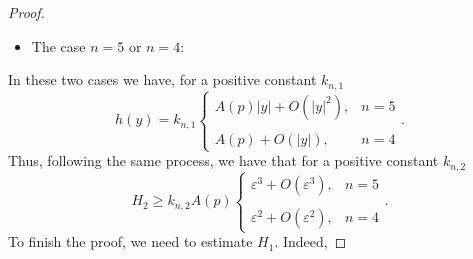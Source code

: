 \documentclass[11pt]{article}
\begin{document}
{\begin{proof}
\begin{itemize}
\item The case $n=5$ or $n=4$:
\end{itemize}
In these two cases we have, for a positive constant $k_{n,1}$
$$h(y)=k_{n,1}\left\{\begin{array}{ll}
A(p)|y|+O(|y|^{2}), & n=5\\
\\
A(p)+O(|y|), & n=4
\end{array}
\right..$$
Thus, following the same process, we have that for a positive constant $k_{n,2}$
$$H_{2}\geq k_{n,2}A(p)\left\{\begin{array}{ll}
\varepsilon^{3}+O(\varepsilon^{3}), & n=5\\
\\
\varepsilon^{2}+O(\varepsilon^{2}), & n=4
\end{array}
\right..$$
To finish the proof, we need to estimate $H_{1}$. Indeed,


\end{proof}}
\end{document}
